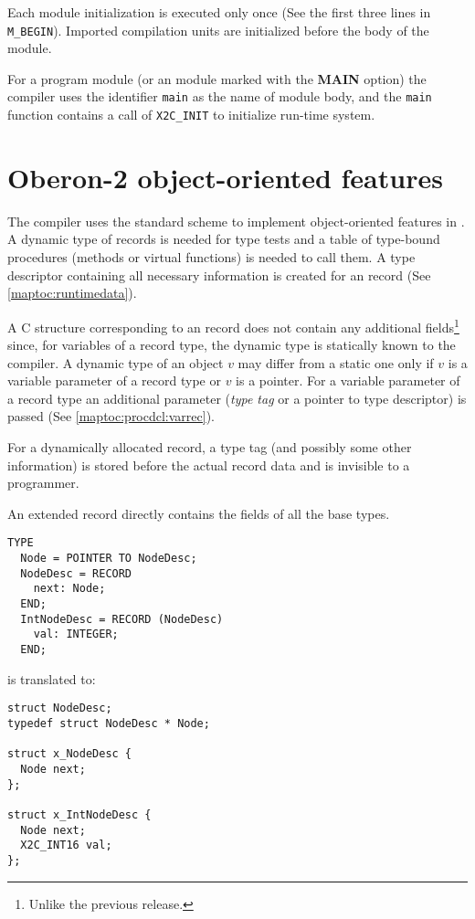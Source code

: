 Each module initialization is executed only once (See the first
three lines in \verb+M_BEGIN+). Imported compilation units
are initialized before the body of the module.

For  a program module (or an \ot{} module marked with the {\bf MAIN}
option)  the  compiler  uses the identifier {\tt main} as the name of
module  body,  and the {\tt main} function contains a call of
\verb+X2C_INIT+ to initialize run-time system.


\section{Oberon-2 object-oriented features}\label{maptoc:o2}

The compiler uses the standard scheme to implement
object-oriented  features  in \ot{}. A dynamic type of records is
needed for type tests and a table of type-bound procedures (methods
or  virtual  functions)  is  needed  to call  them.  A type
descriptor  containing all necessary information
is   created   for   an   \ot{}   record   (See
\ref{maptoc:runtimedata}).

A  C structure corresponding to an \ot{} record does not contain any
additional  fields\footnote{Unlike  the previous \xds{} release.}
since, for variables of a record type, the dynamic type is statically
known to the compiler.  A  dynamic type of an object $v$ may differ
from a static  one  only  if $v$ is a variable parameter of a record
type or $v$ is a pointer. For a variable parameter of a record type
an  additional  parameter  ({\em  type  tag}  or  a pointer to type
descriptor) is passed (See \ref{maptoc:procdcl:varrec}).

For a dynamically allocated record, a type tag (and possibly some
other information) is stored before the actual record data and is
invisible to a programmer.

An extended record directly contains the fields of all the base types.
\begin{verbatim}
TYPE
  Node = POINTER TO NodeDesc;
  NodeDesc = RECORD
    next: Node;
  END;
  IntNodeDesc = RECORD (NodeDesc)
    val: INTEGER;
  END;
\end{verbatim}
is translated to:
\begin{verbatim}
struct NodeDesc;
typedef struct NodeDesc * Node;

struct x_NodeDesc {
  Node next;
};

struct x_IntNodeDesc {
  Node next;
  X2C_INT16 val;
};
\end{verbatim}

